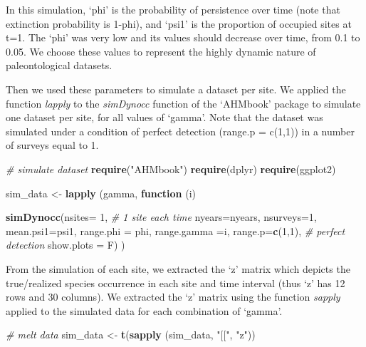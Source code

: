 \documentclass[
]{article}
\newenvironment{Shaded}{\begin{snugshade}}{\end{snugshade}}
\newcommand{\AttributeTok}[1]{\textcolor[rgb]{0.13,0.29,0.53}{#1}}
\newcommand{\CommentTok}[1]{\textcolor[rgb]{0.56,0.35,0.01}{\textit{#1}}}
\newcommand{\ControlFlowTok}[1]{\textcolor[rgb]{0.13,0.29,0.53}{\textbf{#1}}}
\newcommand{\DecValTok}[1]{\textcolor[rgb]{0.00,0.00,0.81}{#1}}
\newcommand{\FunctionTok}[1]{\textcolor[rgb]{0.13,0.29,0.53}{\textbf{#1}}}
\newcommand{\NormalTok}[1]{#1}
\newcommand{\OtherTok}[1]{\textcolor[rgb]{0.56,0.35,0.01}{#1}}
\newcommand{\StringTok}[1]{\textcolor[rgb]{0.31,0.60,0.02}{#1}}
\begin{document}
In this simulation, `phi' is the probability of persistence over time
(note that extinction probability is 1-phi), and `psi1' is the
proportion of occupied sites at t=1. The `phi' was very low and its
values should decrease over time, from 0.1 to 0.05. We choose these
values to represent the highly dynamic nature of paleontological
datasets.

Then we used these parameters to simulate a dataset per site. We applied
the function \emph{lapply} to the \emph{simDynocc} function of the
`AHMbook' package to simulate one dataset per site, for all values of
`gamma'. Note that the dataset was simulated under a condition of
perfect detection (range.p = c(1,1)) in a number of surveys equal to 1.

\begin{Shaded}
\begin{Highlighting}[]
\CommentTok{\# simulate dataset}
\FunctionTok{require}\NormalTok{(}\StringTok{"AHMbook"}\NormalTok{)}
\FunctionTok{require}\NormalTok{(dplyr)}
\FunctionTok{require}\NormalTok{(ggplot2)}

\NormalTok{sim\_data }\OtherTok{\textless{}{-}} \FunctionTok{lapply}\NormalTok{ (gamma, }\ControlFlowTok{function}\NormalTok{ (i) }
  
  
            \FunctionTok{simDynocc}\NormalTok{(}\AttributeTok{nsites=} \DecValTok{1}\NormalTok{, }\CommentTok{\# 1 site each time}
                      \AttributeTok{nyears=}\NormalTok{nyears,}
                      \AttributeTok{nsurveys=}\DecValTok{1}\NormalTok{,}
                      \AttributeTok{mean.psi1=}\NormalTok{psi1,}
                      \AttributeTok{range.phi =}\NormalTok{ phi,}
                      \AttributeTok{range.gamma =}\NormalTok{i,}
                      \AttributeTok{range.p=}\FunctionTok{c}\NormalTok{(}\DecValTok{1}\NormalTok{,}\DecValTok{1}\NormalTok{), }\CommentTok{\# perfect detection}
                      \AttributeTok{show.plots =}\NormalTok{ F)}
\NormalTok{            )}
\end{Highlighting}
\end{Shaded}

From the simulation of each site, we extracted the `z' matrix which
depicts the true/realized species occurrence in each site and time
interval (thus `z' has 12 rows and 30 columns). We extracted the `z'
matrix using the function \emph{sapply} applied to the simulated data
for each combination of `gamma'.

\begin{Shaded}
\begin{Highlighting}[]
\CommentTok{\# melt data}
\NormalTok{sim\_data }\OtherTok{\textless{}{-}} \FunctionTok{t}\NormalTok{(}\FunctionTok{sapply}\NormalTok{ (sim\_data, }\StringTok{"[["}\NormalTok{, }\StringTok{"z"}\NormalTok{))}
\end{Highlighting}
\end{Shaded}
\end{document}
